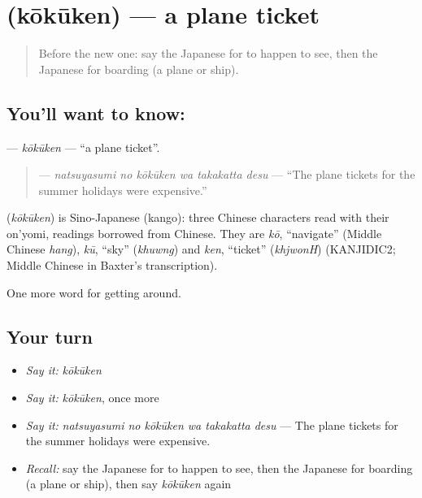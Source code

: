 \section[\texorpdfstring{\ja{こうくうけん} (kōkūken)}{こうくうけん (kōkūken)}]{ (kōkūken) — a plane ticket}

\label{lesson:JA-C387-koukuuken}



\begin{quote}
Before the new one: say the Japanese for to happen to see, then the Japanese for boarding (a plane or ship).
\end{quote}

\subsection*{You'll want to know: }
\textbf{} — \emph{kōkūken} — \textquotedblleft{}a plane ticket\textquotedblright{}.

\begin{quote}
\textbf{  } — \emph{natsuyasumi no kōkūken wa takakatta desu} — \textquotedblleft{}The plane tickets for the summer holidays were expensive.\textquotedblright{}
\end{quote}

\begin{cousinweb}
\textbf{} (\emph{kōkūken}) is Sino-Japanese (kango): three Chinese characters read with their on'yomi, readings borrowed from Chinese. They are \emph{kō}, \textquotedblleft{}navigate\textquotedblright{} (Middle Chinese \emph{hang}), \emph{kū}, \textquotedblleft{}sky\textquotedblright{} (\emph{khuwng}) and \emph{ken}, \textquotedblleft{}ticket\textquotedblright{} (\emph{khjwonH}) (KANJIDIC2; Middle Chinese in Baxter's transcription).
\end{cousinweb}

\begin{grammarlens}[title={What you've built}]
One more word for getting around.
\end{grammarlens}

\subsection*{Your turn}
\begin{itemize}
\raggedright
  \item \emph{Say it:} \emph{kōkūken}
  \item \emph{Say it:} \emph{kōkūken}, once more
  \item \emph{Say it:} \emph{natsuyasumi no kōkūken wa takakatta desu} — The plane tickets for the summer holidays were expensive.
  \item \emph{Recall:} say the Japanese for to happen to see, then the Japanese for boarding (a plane or ship), then say \emph{kōkūken} again
\end{itemize}

